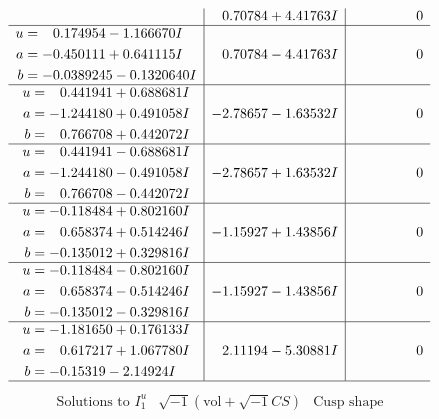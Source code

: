 \documentclass[1p]{elsarticle_modified}
\theoremstyle{definition}
\newcommand{\I}{\sqrt{-1}}
\begin{document}
$$\begin{array}{c|c|c}
 & \phantom{-}0.70784 + 4.41763 I & \phantom{-0.000000 } 0 \\ \hline\begin{aligned}
u &= \phantom{-}0.174954 - 1.166670 I \\
a &= -0.450111 + 0.641115 I \\
b &= -0.0389245 - 0.1320640 I\end{aligned}
 & \phantom{-}0.70784 - 4.41763 I & \phantom{-0.000000 } 0 \\ \hline\begin{aligned}
u &= \phantom{-}0.441941 + 0.688681 I \\
a &= -1.244180 + 0.491058 I \\
b &= \phantom{-}0.766708 + 0.442072 I\end{aligned}
 & -2.78657 - 1.63532 I & \phantom{-0.000000 } 0 \\ \hline\begin{aligned}
u &= \phantom{-}0.441941 - 0.688681 I \\
a &= -1.244180 - 0.491058 I \\
b &= \phantom{-}0.766708 - 0.442072 I\end{aligned}
 & -2.78657 + 1.63532 I & \phantom{-0.000000 } 0 \\ \hline\begin{aligned}
u &= -0.118484 + 0.802160 I \\
a &= \phantom{-}0.658374 + 0.514246 I \\
b &= -0.135012 + 0.329816 I\end{aligned}
 & -1.15927 + 1.43856 I & \phantom{-0.000000 } 0 \\ \hline\begin{aligned}
u &= -0.118484 - 0.802160 I \\
a &= \phantom{-}0.658374 - 0.514246 I \\
b &= -0.135012 - 0.329816 I\end{aligned}
 & -1.15927 - 1.43856 I & \phantom{-0.000000 } 0 \\ \hline\begin{aligned}
u &= -1.181650 + 0.176133 I \\
a &= \phantom{-}0.617217 + 1.067780 I \\
b &= -0.15319 - 2.14924 I\end{aligned}
 & \phantom{-}2.11194 - 5.30881 I & \phantom{-0.000000 } 0\\
 \hline 
 \end{array}$$\newpage$$\begin{array}{c|c|c}  
\text{Solutions to }I^u_{1}& \I (\text{vol} + \sqrt{-1}CS) & \text{Cusp shape}\\

\end{array}$$
\end{document}

